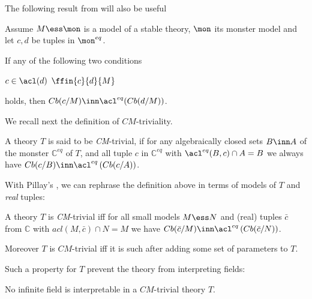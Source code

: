 The following result from \cite{pilcm} will also be useful
\begin{fact}\label{pilcb}
Assume $M\ess\mon$ is a model of a stable theory, $\mon$ its monster model and let $c,d$ be tuples in $\mon^{eq}$.

If any of the following two conditions
\begin{itemize}
$c\in\acl(d)$ %
$\ffin{c}{d}{M}$ %
\end{itemize}
holds, then $Cb(c/M)\inn\acl^{eq}(Cb(d/M))$.
\end{fact}

\smallskip
We recall next the definition of $CM$-triviality.
\begin{dfn}\label{cmtdef}
A theory $T$ is said to be {\sl CM}-trivial, if for any algebraically closed sets $B\inn A$ of the monster $\mathbb{C}^{eq}$ of $T$,
and all tuple $c$ in $\mathbb{C}^{eq}$ with $\acl^{eq}(B,c)\cap A=B$ we always have $Cb(c/B)\inn\acl^{eq}\left(Cb(c/A)\right)$.
\end{dfn}

With Pillay's \cite[Corollary 2.5]{pilcm}, we can rephrase the definition above in terms of models of $T$ and {\em real} tuples:
\begin{fact}\label{pilcmt}
A theory $T$ is {\sl CM}-trivial iff for all small models $M\ess N$ and (real) tuples $\bar c$ from $\mathbb{C}$ with
$acl(M,\bar c)\cap N=M$ we have $Cb(\bar c/M)\inn\acl^{eq}\left(Cb(\bar c/N)\right)$.

Moreover $T$ is $CM$-trivial iff it is such after adding some set of parameters to $T$.
\end{fact}
Such a property for $T$ prevent the theory from interpreting fields:
\begin{fact}
No infinite field is interpretable in a $CM$-trivial theory $T$.
\end{fact}
